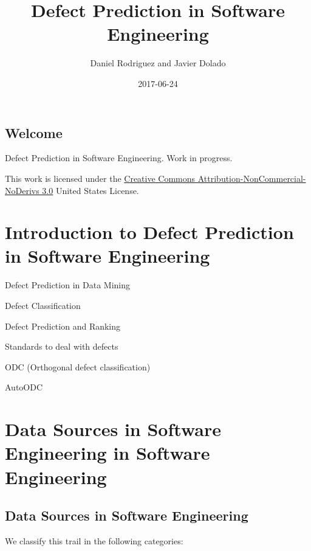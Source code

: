 \documentclass[]{book}
\title{Defect Prediction in Software Engineering}
\author{Daniel Rodriguez and Javier Dolado}
\date{2017-06-24}
\theoremstyle{definition}
\theoremstyle{definition}
\theoremstyle{remark}
\begin{document}
\maketitle

{
\setcounter{tocdepth}{1}
\tableofcontents
}
\chapter*{Welcome}\label{welcome}

Defect Prediction in Software Engineering. Work in progress.

This work is licensed under the
\href{http://creativecommons.org/licenses/by-nc-nd/3.0/us/}{Creative
Commons Attribution-NonCommercial-NoDerivs 3.0} United States License.

\part{Introduction to Defect Prediction in Software
Engineering}\label{part-introduction-to-defect-prediction-in-software-engineering}

Defect Prediction in Data Mining

Defect Classification

Defect Prediction and Ranking

Standards to deal with defects

ODC (Orthogonal defect classification)

AutoODC

\part{Data Sources in Software Engineering in Software
Engineering}\label{part-data-sources-in-software-engineering-in-software-engineering}

\chapter{Data Sources in Software
Engineering}\label{data-sources-in-software-engineering}

We classify this trail in the following categories:
\end{document}
